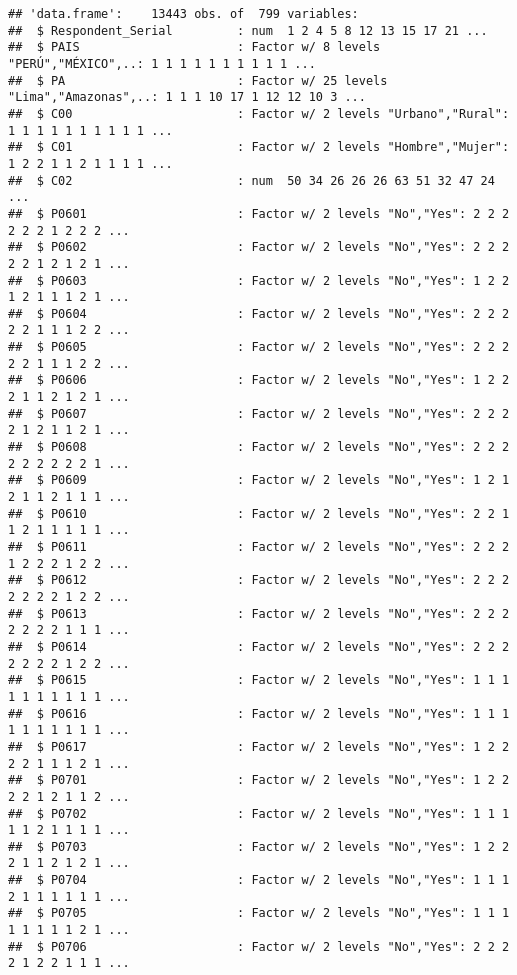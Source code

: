 \documentclass[
]{article}
\begin{document}
\begin{verbatim}
## 'data.frame':    13443 obs. of  799 variables:
##  $ Respondent_Serial         : num  1 2 4 5 8 12 13 15 17 21 ...
##  $ PAIS                      : Factor w/ 8 levels "PERÚ","MÉXICO",..: 1 1 1 1 1 1 1 1 1 1 ...
##  $ PA                        : Factor w/ 25 levels "Lima","Amazonas",..: 1 1 1 10 17 1 12 12 10 3 ...
##  $ C00                       : Factor w/ 2 levels "Urbano","Rural": 1 1 1 1 1 1 1 1 1 1 ...
##  $ C01                       : Factor w/ 2 levels "Hombre","Mujer": 1 2 2 1 1 2 1 1 1 1 ...
##  $ C02                       : num  50 34 26 26 26 63 51 32 47 24 ...
##  $ P0601                     : Factor w/ 2 levels "No","Yes": 2 2 2 2 2 2 1 2 2 2 ...
##  $ P0602                     : Factor w/ 2 levels "No","Yes": 2 2 2 2 2 1 2 1 2 1 ...
##  $ P0603                     : Factor w/ 2 levels "No","Yes": 1 2 2 1 2 1 1 1 2 1 ...
##  $ P0604                     : Factor w/ 2 levels "No","Yes": 2 2 2 2 2 1 1 1 2 2 ...
##  $ P0605                     : Factor w/ 2 levels "No","Yes": 2 2 2 2 2 1 1 1 2 2 ...
##  $ P0606                     : Factor w/ 2 levels "No","Yes": 1 2 2 2 1 1 2 1 2 1 ...
##  $ P0607                     : Factor w/ 2 levels "No","Yes": 2 2 2 2 1 2 1 1 2 1 ...
##  $ P0608                     : Factor w/ 2 levels "No","Yes": 2 2 2 2 2 2 2 2 2 1 ...
##  $ P0609                     : Factor w/ 2 levels "No","Yes": 1 2 1 2 1 1 2 1 1 1 ...
##  $ P0610                     : Factor w/ 2 levels "No","Yes": 2 2 1 1 2 1 1 1 1 1 ...
##  $ P0611                     : Factor w/ 2 levels "No","Yes": 2 2 2 1 2 2 2 1 2 2 ...
##  $ P0612                     : Factor w/ 2 levels "No","Yes": 2 2 2 2 2 2 2 1 2 2 ...
##  $ P0613                     : Factor w/ 2 levels "No","Yes": 2 2 2 2 2 2 2 1 1 1 ...
##  $ P0614                     : Factor w/ 2 levels "No","Yes": 2 2 2 2 2 2 2 1 2 2 ...
##  $ P0615                     : Factor w/ 2 levels "No","Yes": 1 1 1 1 1 1 1 1 1 1 ...
##  $ P0616                     : Factor w/ 2 levels "No","Yes": 1 1 1 1 1 1 1 1 1 1 ...
##  $ P0617                     : Factor w/ 2 levels "No","Yes": 1 2 2 2 2 1 1 1 2 1 ...
##  $ P0701                     : Factor w/ 2 levels "No","Yes": 1 2 2 2 2 1 2 1 1 2 ...
##  $ P0702                     : Factor w/ 2 levels "No","Yes": 1 1 1 1 1 2 1 1 1 1 ...
##  $ P0703                     : Factor w/ 2 levels "No","Yes": 1 2 2 2 1 1 2 1 2 1 ...
##  $ P0704                     : Factor w/ 2 levels "No","Yes": 1 1 1 2 1 1 1 1 1 1 ...
##  $ P0705                     : Factor w/ 2 levels "No","Yes": 1 1 1 1 1 1 1 1 2 1 ...
##  $ P0706                     : Factor w/ 2 levels "No","Yes": 2 2 2 2 1 2 2 1 1 1 ...

\end{verbatim}
\end{document}
